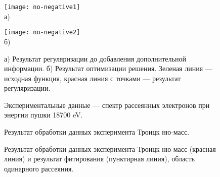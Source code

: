 \begin{figure}[htbp!]
\begin{center}
\begin{minipage}[h]{0.45\linewidth}
\texttt{[image: no-negative1]} \\а)
\end{minipage}
\hfill 
\begin{minipage}[h]{0.45\linewidth}
\texttt{[image: no-negative2]} \\б)
\end{minipage}
\caption{а) Результат регуляризации до добавления дополнительной информации. б) Результат оптимизации решения. Зеленая линия --- исходная функция, красная линия с точками --- результат регуляризации.}
\label{pic:aprioriopt}
\end{center}
\end{figure}

\begin{figure}[htbp! ]
	\label{pic:exp1}
	\caption{Экспериментальные данные --- спектр рассеянных электронов при энергии пушки 18700 eV.}
\end{figure}

\begin{figure}[htbp! ]
	\label{pic:exp3}
	\caption{Результат обработки данных эксперимента Троицк ню-масс.}
\end{figure}

\begin{figure}[htbp! ]
	\label{pic:exp2}
	\caption{Результат обработки данных эксперимента Троицк ню-масс (красная линия) и результат фитирования (пунктирная линия), область одинарного рассеяния.}
\end{figure}